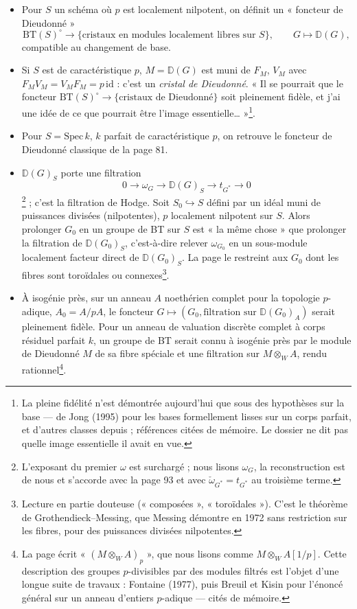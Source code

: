 \documentclass[11pt,a4paper]{article}
\begin{document}
\begin{itemize}
  \item[I)] Pour $S$ un schéma où $p$ est localement nilpotent, on définit
  un « foncteur de Dieudonné »
  \[
  \mathrm{BT}(S)^{\circ} \longrightarrow \{\text{cristaux en modules
  localement libres sur } S\}, \qquad G \longmapsto \mathbb{D}(G),
  \]
  compatible au changement de base.
  \item[II)] Si $S$ est de caractéristique $p$, $M = \mathbb{D}(G)$ est
  muni de $F_M$, $V_M$ avec $F_M V_M = V_M F_M = p\,\mathrm{id}$ : c'est
  un \emph{cristal de Dieudonné}. « Il se pourrait que le foncteur
  $\mathrm{BT}(S)^{\circ} \to \{\text{cristaux de Dieudonné}\}$ soit
  pleinement fidèle, et j'ai une idée de ce que pourrait être l'image
  essentielle… »\footnote{La pleine fidélité n'est démontrée aujourd'hui
  que sous des hypothèses sur la base — de Jong (1995) pour les bases
  formellement lisses sur un corps parfait, et d'autres classes depuis ;
  références citées de mémoire. Le dossier ne dit pas quelle image
  essentielle il avait en vue.}.
  \item[III)] Pour $S = \mathrm{Spec}\, k$, $k$ parfait de
  caractéristique $p$, on retrouve le foncteur de Dieudonné classique de
  la page 81.
  \item[IV)] $\mathbb{D}(G)_S$ porte une filtration
  \[
  0 \to \omega_G \to \mathbb{D}(G)_S \to t_{G^{*}} \to 0
  \]
  \footnote{L'exposant du premier $\omega$ est surchargé ; nous lisons
  $\omega_G$, la reconstruction est de nous et s'accorde avec la page 93
  et avec $\check{\omega}_{G^{*}} = t_{G^{*}}$ au troisième terme.} ;
  c'est la filtration de Hodge. Soit $S_0 \hookrightarrow S$ défini par
  un idéal muni de puissances divisées (nilpotentes), $p$ localement
  nilpotent sur $S$. Alors prolonger $G_0$ en un groupe de BT sur $S$
  est « la même chose » que prolonger la filtration de
  $\mathbb{D}(G_0)_S$, c'est-à-dire relever $\omega_{G_0}$ en un
  sous-module localement facteur direct de $\mathbb{D}(G_0)_S$. La page
  le restreint aux $G_0$ dont les fibres sont toroïdales ou
  connexes\footnote{Lecture en partie douteuse (« composées »,
  « toroïdales »). C'est le théorème de Grothendieck–Messing, que Messing
  démontre en 1972 sans restriction sur les fibres, pour des puissances
  divisées nilpotentes.}.
  \item[V)] À isogénie près, sur un anneau $A$ noethérien complet pour la
  topologie $p$-adique, $A_0 = A/pA$, le foncteur $G \mapsto (G_0,
  \text{filtration sur } \mathbb{D}(G_0)_A)$ serait pleinement fidèle. Pour
  un anneau de valuation discrète complet à corps résiduel parfait $k$,
  un groupe de BT serait connu à isogénie près par le module de Dieudonné
  $M$ de sa fibre spéciale et une filtration sur $M \otimes_W A$, rendu
  rationnel\footnote{La page écrit « $(M \otimes_W A)_p$ », que nous
  lisons comme $M \otimes_W A[1/p]$. Cette description des groupes
  $p$-divisibles par des modules filtrés est l'objet d'une longue suite
  de travaux : Fontaine (1977), puis Breuil et Kisin pour l'énoncé
  général sur un anneau d'entiers $p$-adique — cités de mémoire.}.
\end{itemize}
\end{document}
